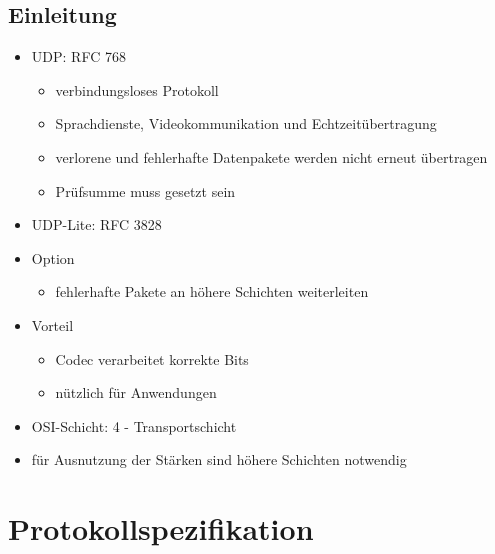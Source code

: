 \documentclass{beamer}
\begin{document}
\begin{frame}
\section{Einleitung}
\begin{itemize}
\item UDP: RFC 768
	\begin{itemize}
	\item verbindungsloses Protokoll
	\item Sprachdienste, Videokommunikation und Echtzeitübertragung
	\item verlorene und fehlerhafte Datenpakete werden nicht erneut übertragen
	\item Prüfsumme muss gesetzt sein
	\end{itemize}
\end{itemize}
\par
\begin{itemize}
\item UDP-Lite: RFC 3828
\item Option
	\begin{itemize}
	\item fehlerhafte Pakete an höhere Schichten weiterleiten
	\end{itemize}
\item Vorteil
	\begin{itemize}
	\item Codec verarbeitet korrekte Bits
	\item nützlich für Anwendungen
	\end{itemize}
\end{itemize}
\par
\begin{itemize}
\item OSI-Schicht: 4 - Transportschicht
\item für Ausnutzung der Stärken sind höhere Schichten notwendig
\end{itemize}
\end{frame}


\section{Protokollspezifikation}
\end{document}
